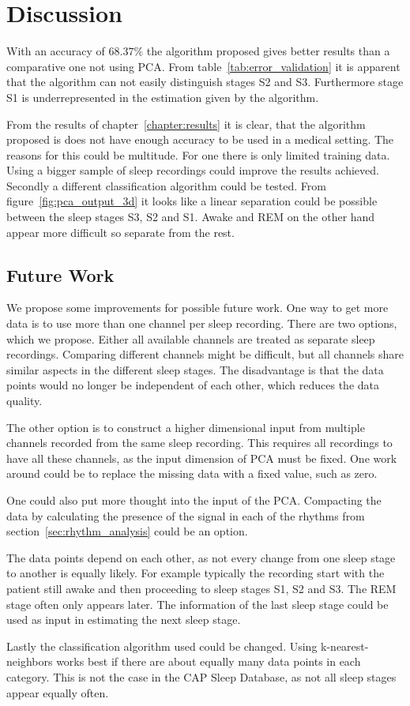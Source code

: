 \chapter{Discussion}
\label{chapter:discussion}

With an accuracy of $68.37\%$ the algorithm proposed gives better results than a comparative one not using PCA. From table~\ref{tab:error_validation} it is apparent that the algorithm can not easily distinguish stages S2 and S3. Furthermore stage S1 is underrepresented in the estimation given by the algorithm.

From the results of chapter~\ref{chapter:results} it is clear, that the algorithm proposed is does not have enough accuracy to be used in a medical setting. The reasons for this could be multitude. For one there is only limited training data. Using a bigger sample of sleep recordings could improve the results achieved. Secondly a different classification algorithm could be tested. From figure~\ref{fig:pca_output_3d} it looks like a linear separation could be possible between the sleep stages S3, S2 and S1. Awake and REM on the other hand appear more difficult so separate from the rest.

\section{Future Work}
We propose some improvements for possible future work. One way to get more data is to use more than one channel per sleep recording. There are two options, which we propose. Either all available channels are treated as separate sleep recordings. Comparing different channels might be difficult, but all channels share similar aspects in the different sleep stages. The disadvantage is that the data points would no longer be independent of each other, which reduces the data quality.

The other option is to construct a higher dimensional input from multiple channels recorded from the same sleep recording. This requires all recordings to have all these channels, as the input dimension of PCA must be fixed. One work around could be to replace the missing data with a fixed value, such as zero.

One could also put more thought into the input of the PCA. Compacting the data by calculating the presence of the signal in each of the rhythms from section~\ref{sec:rhythm_analysis} could be an option.

The data points depend on each other, as not every change from one sleep stage to another is equally likely. For example typically the recording start with the patient still awake and then proceeding to sleep stages S1, S2 and S3. The REM stage often only appears later. The information of the last sleep stage could be used as input in estimating the next sleep stage.

Lastly the classification algorithm used could be changed. Using k-nearest-neighbors works best if there are about equally many data points in each category. This is not the case in the CAP Sleep Database, as not all sleep stages appear equally often.